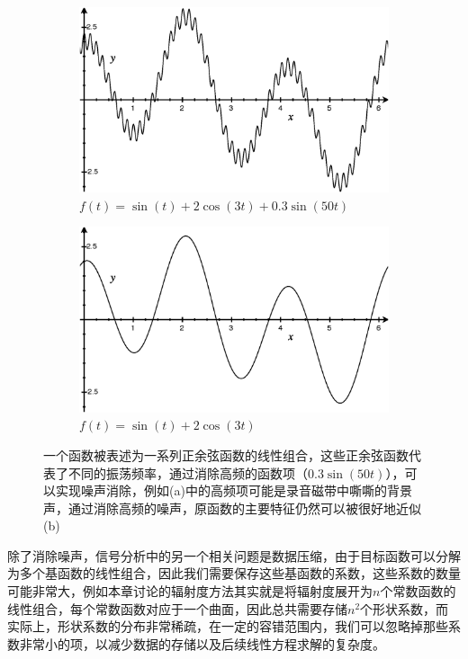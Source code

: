 \begin{figure}
\begin{fullwidth}
	\begin{subfigure}[b]{0.5\thewidth}
		\includegraphics[width=1.0\textwidth]{figures/r/fourier-1}
		\caption{$f(t)=\sin (t)+2\cos(3t)+0.3\sin(50t)$}
	\end{subfigure}
	\begin{subfigure}[b]{0.5\thewidth}
		\includegraphics[width=1.0\textwidth]{figures/r/fourier-2}
		\caption{$f(t)=\sin (t)+2\cos(3t)$}
	\end{subfigure}
	\caption{一个函数被表述为一系列正余弦函数的线性组合，这些正余弦函数代表了不同的振荡频率，通过消除高频的函数项（$0.3\sin(50t)$），可以实现噪声消除，例如(a)中的高频项可能是录音磁带中嘶嘶的背景声，通过消除高频的噪声，原函数的主要特征仍然可以被很好地近似(b)}
	\label{f:r-fourier}
\end{fullwidth}
\end{figure}

除了消除噪声，信号分析中的另一个相关问题是数据压缩，由于目标函数可以分解为多个基函数的线性组合，因此我们需要保存这些基函数的系数，这些系数的数量可能非常大，例如本章讨论的辐射度方法其实就是将辐射度展开为$n$个常数函数的线性组合，每个常数函数对应于一个曲面，因此总共需要存储$n^{2}$个形状系数，而实际上，形状系数的分布非常稀疏，在一定的容错范围内，我们可以忽略掉那些系数非常小的项，以减少数据的存储以及后续线性方程求解的复杂度。

